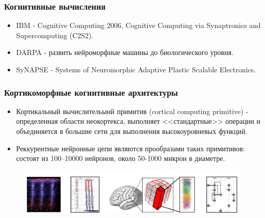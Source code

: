 \documentclass[default]{beamer}
\begin{document}
	\begin{frame}	
		\frametitle{Когнитивные вычисления}
		
		\begin{itemize}
			\item IBM - Cognitive Computing 2006, Cognitive Computing via Synaptronics and Supercomputing (C2S2).
			\item DARPA - развить нейроморфные машины до биологического уровня.
			\item SyNAPSE - Systems of Neuromorphic Adaptive Plastic Scalable Electronics.
		\end{itemize}
		
	\end{frame}	

	\begin{frame}
		\frametitle{Кортикоморфные когнитивные архитектуры}
		
		\begin{itemize}
			\item Кортикальный вычислительынй примитив (cortical computing primitive) - определенная области неокортекса, выполняет <<стандартные>> операции и объединяется в большие сети для выполнения высокоуровневых функций.
			\item Реккурентные нейронные цепи являются прообразами таких примитивов: состоят из 100--10000 нейронов, около 50-1000 микрон в диаметре.
		\end{itemize}
		
		\begin{figure}
			\includegraphics[width=\textwidth]{brain-prim}
		\end{figure}
		
	\end{frame}	
	
\end{document}
